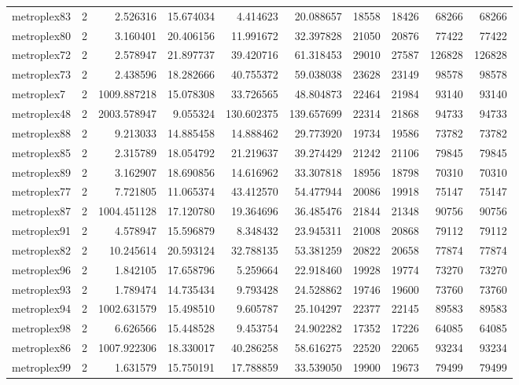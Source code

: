 \begin{longtable}{|l|r|r|r|r|r|r|r|r|r|}
metroplex83 & 2 & 2.526316 & 15.674034 & 4.414623 & 20.088657 & 18558 & 18426 & 68266 & 68266 \\
metroplex80 & 2 & 3.160401 & 20.406156 & 11.991672 & 32.397828 & 21050 & 20876 & 77422 & 77422 \\
metroplex72 & 2 & 2.578947 & 21.897737 & 39.420716 & 61.318453 & 29010 & 27587 & 126828 & 126828 \\
metroplex73 & 2 & 2.438596 & 18.282666 & 40.755372 & 59.038038 & 23628 & 23149 & 98578 & 98578 \\
metroplex7 & 2 & 1009.887218 & 15.078308 & 33.726565 & 48.804873 & 22464 & 21984 & 93140 & 93140 \\
metroplex48 & 2 & 2003.578947 & 9.055324 & 130.602375 & 139.657699 & 22314 & 21868 & 94733 & 94733 \\
metroplex88 & 2 & 9.213033 & 14.885458 & 14.888462 & 29.773920 & 19734 & 19586 & 73782 & 73782 \\
metroplex85 & 2 & 2.315789 & 18.054792 & 21.219637 & 39.274429 & 21242 & 21106 & 79845 & 79845 \\
metroplex89 & 2 & 3.162907 & 18.690856 & 14.616962 & 33.307818 & 18956 & 18798 & 70310 & 70310 \\
metroplex77 & 2 & 7.721805 & 11.065374 & 43.412570 & 54.477944 & 20086 & 19918 & 75147 & 75147 \\
metroplex87 & 2 & 1004.451128 & 17.120780 & 19.364696 & 36.485476 & 21844 & 21348 & 90756 & 90756 \\
metroplex91 & 2 & 4.578947 & 15.596879 & 8.348432 & 23.945311 & 21008 & 20868 & 79112 & 79112 \\
metroplex82 & 2 & 10.245614 & 20.593124 & 32.788135 & 53.381259 & 20822 & 20658 & 77874 & 77874 \\
metroplex96 & 2 & 1.842105 & 17.658796 & 5.259664 & 22.918460 & 19928 & 19774 & 73270 & 73270 \\
metroplex93 & 2 & 1.789474 & 14.735434 & 9.793428 & 24.528862 & 19746 & 19600 & 73760 & 73760 \\
metroplex94 & 2 & 1002.631579 & 15.498510 & 9.605787 & 25.104297 & 22377 & 22145 & 89583 & 89583 \\
metroplex98 & 2 & 6.626566 & 15.448528 & 9.453754 & 24.902282 & 17352 & 17226 & 64085 & 64085 \\
metroplex86 & 2 & 1007.922306 & 18.330017 & 40.286258 & 58.616275 & 22520 & 22065 & 93234 & 93234 \\
metroplex99 & 2 & 1.631579 & 15.750191 & 17.788859 & 33.539050 & 19900 & 19673 & 79499 & 79499 \\

\end{longtable}
